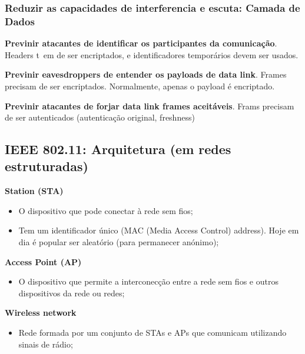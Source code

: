 \documentclass{article}
\begin{document}
\pagebreak

\subsubsection{Reduzir as capacidades de interferencia e escuta: Camada de Dados}

\begin{flushleft}
  \textbf{Previnir atacantes de identificar os participantes da comunicação}. Headers t~em de ser
  encriptados, e identificadores temporários devem ser usados.

  \vspace{2mm}

  \textbf{Previnir eavesdroppers de entender os payloads de data link}.
  Frames precisam de ser encriptados. Normalmente, apenas o payload é encriptado.

  \vspace{2mm}

  \textbf{Previnir atacantes de forjar data link frames aceitáveis}.
  Frams precisam de ser autenticados (autenticação original, freshness)
\end{flushleft}

\subsection{IEEE 802.11: Arquitetura (em redes estruturadas)}

\begin{flushleft}
  \textbf{Station (STA)}
  \begin{itemize}
    \item O dispositivo que pode conectar à rede sem fios;
    \item Tem um identificador único (MAC (Media Access Control) address).
    Hoje em dia é popular ser aleatório (para permanecer anónimo);
  \end{itemize}

  \textbf{Access Point (AP)}
  \begin{itemize}
    \item O dispositivo que permite a interconecção entre a rede sem fios
    e outros dispositivos da rede ou redes; 
  \end{itemize}

  \textbf{Wireless network}
  \begin{itemize}
    \item Rede formada por um conjunto de STAs e APs que comunicam utilizando
    sinais de rádio;
  \end{itemize}
\end{flushleft}
\end{document}
